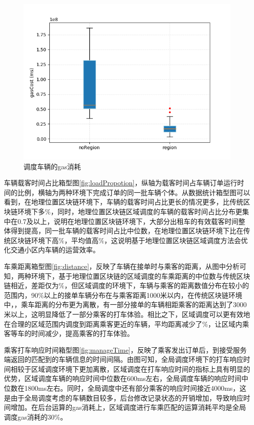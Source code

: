 \begin{figure}
  \centering
  \includegraphics[width=1.0\textwidth]{figures/gasCost}
  \caption{调度车辆的gas消耗}\label{fig:gasCost}
\end{figure}

车辆载客时间占比箱型图\ref{fig:loadPropotion}，纵轴为载客时间占车辆订单运行时间的比例，横轴为两种环境下完成订单的同一批车辆个体。从数据统计箱型图可以看到，在地理位置区块链环境下，车辆的载客时间占比更长的情况更多，比传统区块链环境下多$\%$，同时，地理位置区块链区域调度的车辆的载客时间占比分布更集中在0.7及以上，说明在地理位置区块链环境下，大部分出租车的有效载客时间整体得到提高，同一批车辆的载客时间占比中位数，在地理位置区块链环境下比在传统区块链环境下高$\%$，平均值高$\%$，这说明基于地理位置区块链区域调度方法会优化交通小区内车辆的运营效率。

车乘距离箱型图\ref{fig:distance}，反映了车辆在接单时与乘客的距离，从图中分析可知，两种环境下，基于地理位置区块链的区域调度的车乘距离的中位数与传统区块链相近，差距仅为$\%$，但区域调度的环境下，车辆与乘客的距离数值分布在较小的范围内，90$\%$以上的接单车辆分布在与乘客距离1000米以内，在传统区块链环境中，，乘车距离的分布更为离散，有一部分接单的车辆相距乘客的距离达到了3000米以上，这明显降低了一部分乘客的打车体验。相比之下，区域调度可以更有效地在合理的区域范围内调度到距离乘客更近的车辆，平均距离减少了$\%$，让区域内乘客等车的时间减少，提高乘客的打车体验。

乘客打车响应时间箱型图\ref{fig:manageTime}，反映了乘客发出订单后，到接受服务端返回的匹配到的车辆信息的时间间隔。由图可知，全局调度环境下的打车响应时间相较于区域调度环境下更加离散，区域调度在打车响应时间的指标上具有明显的优势，区域调度车辆的响应时间中位数在600ms左右，全局调度车辆的响应时间中位数在1800ms左右。同时，全局调度中还有部分乘客的响应时间接近4000ms，这是由于全局调度考虑的车辆数目较多，后台修改记录状态的开销增加，导致响应时间增加。在后台运算的gas消耗上，区域调度进行车乘匹配的运算消耗平均是全局调度gas消耗的30$\%$。

